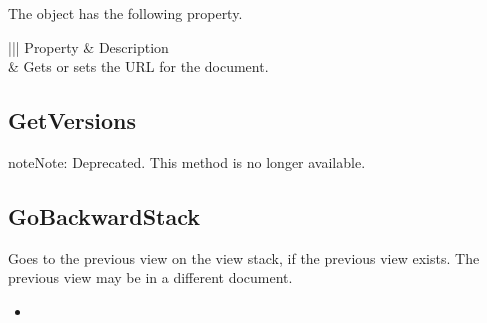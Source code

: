 \documentclass[letterpaper,12pt,english,openany,oneside]{sphinxmanual}
\begin{document}

The  object has the following property.


\begin{savenotes}\sphinxattablestart
\centering
{}\label{\detokenize{IAC_API_OLE_Objects:section-94}}\nobreak
\begin{tabular}[t]{|||}
\hline
\sphinxstyletheadfamily 
Property
&\sphinxstyletheadfamily 
Description
\\
\hline
{}
&
Gets or sets the URL for the document.
\\
\hline
\end{tabular}
\par
\sphinxattableend\end{savenotes}




\subsection{GetVersions}
\label{\detokenize{IAC_API_OLE_Objects:getversions}}
\begin{sphinxadmonition}{note}{Note:}
Deprecated. This method is no longer available.
\end{sphinxadmonition}


\begin{sphinxVerbatim}[commandchars=\\\{\}]
 
\end{sphinxVerbatim}




\subsection{GoBackwardStack}
\label{\detokenize{IAC_API_OLE_Objects:gobackwardstack}}
Goes to the previous view on the view stack, if the previous view exists. The previous view may be in a different document.


\begin{sphinxVerbatim}[commandchars=\\\{\}]
 
\end{sphinxVerbatim}
\label{\detokenize{IAC_API_OLE_Objects:related-methods-134}}
\begin{itemize}
\item {} 
 

\end{itemize}
\end{document}
